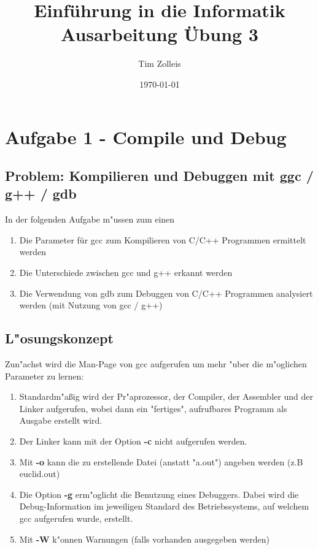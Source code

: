 \documentclass[a4paper,11pt,titlepage]{article}
\begin{document}
    \title{Einf\"uhrung in die Informatik\\
    Ausarbeitung \"Ubung 3}


    \author{Tim Zolleis}


    \date{\today}

    \maketitle{\thispagestyle{plain}}


    \section{Aufgabe 1 - Compile und Debug}

    \subsection{Problem: Kompilieren und Debuggen mit ggc / g++ / gdb}
    In der folgenden Aufgabe m"ussen zum einen
    \begin{enumerate}
        \item Die Parameter für gcc zum Kompilieren von C/C++ Programmen ermittelt werden
        \item Die Unterschiede zwischen gcc und g++ erkannt werden
        \item Die Verwendung von gdb zum Debuggen von C/C++ Programmen analysiert werden (mit Nutzung von gcc / g++)
    \end{enumerate}

    \subsection{L"osungskonzept}
    Zun"achst wird die Man-Page von gcc aufgerufen um mehr "uber die m"oglichen Parameter zu lernen:
    \begin{enumerate}
        \item Standardm"aßig wird der Pr"aprozessor, der Compiler, der Assembler und der Linker aufgerufen, wobei dann ein "fertiges", aufrufbares Programm als Ausgabe erstellt wird.
        \item Der Linker kann mit der Option \textbf{-c} nicht aufgerufen werden.
        \item Mit \textbf{-o} kann die zu erstellende Datei (anstatt "a.out") angeben werden (z.B euclid.out)
        \item Die Option \textbf{-g} erm"oglicht die Benutzung eines Debuggers. Dabei wird die Debug-Information im jeweiligen Standard des Betriebssystems, auf welchem gcc aufgerufen wurde, erstellt.
        \item Mit \textbf{-W} k"onnen Warnungen (falls vorhanden ausgegeben werden)
    \end{enumerate}
\end{document}
